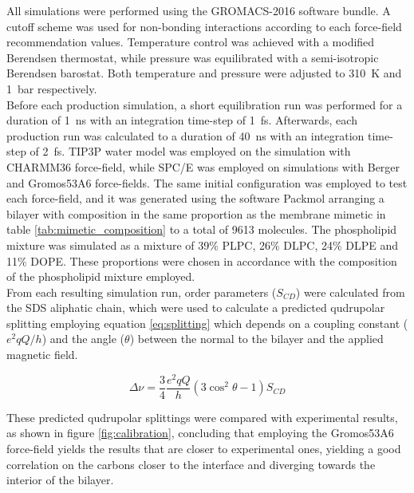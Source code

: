\documentclass[9pt]{article}
\begin{document}
All simulations were performed using the GROMACS-2016
software bundle. A cutoff scheme was used for non-bonding interactions according
to each force-field recommendation values. Temperature control was achieved with
a modified Berendsen thermostat, while pressure was
equilibrated with a semi-isotropic Berendsen barostat. Both temperature and
pressure were adjusted to \SI{310}{K} and \SI{1}{bar} respectively.\\
Before each production simulation, a short equilibration run was performed for a
duration of \SI{1}{ns} with an integration time-step of \SI{1}{fs}. Afterwards,
each production run was calculated to a duration of \SI{40}{ns} with an
integration time-step of \SI{2}{fs}. TIP3P water model was employed on the
simulation with CHARMM36 force-field, while SPC/E was employed on simulations
with Berger and Gromos53A6 force-fields. The same initial configuration was
employed to test each force-field, and it was generated using the software
Packmol arranging a bilayer with composition in the same
proportion as the membrane mimetic in table \ref{tab:mimetic_composition} to a
total of 9613 molecules. The phospholipid mixture was simulated as a mixture of
39\% PLPC, 26\% DLPC, 24\% DLPE and 11\% DOPE. These proportions were chosen in
accordance with the composition of the phospholipid mixture employed.\\

From each resulting simulation run, order parameters ($S_{CD}$) were calculated
from the SDS aliphatic chain, which were used to calculate a predicted qudrupolar
splitting employing equation \ref{eq:splitting} which depends on a coupling
constant ($e^2qQ/h$) and the angle ($\theta$) between the normal to the bilayer and the
applied magnetic field.

\begin{equation}
  \label{eq:splitting}
  \Delta\nu = \frac{3}{4} \frac{e^2qQ}{h}(3\cos^2\theta - 1) S_{CD}
\end{equation}

These predicted qudrupolar splittings were compared with experimental results,
as shown in figure \ref{fig:calibration}, concluding that employing the
Gromos53A6 force-field yields the results that are closer to experimental
ones, yielding a good correlation on the carbons closer to the interface and
diverging towards the interior of the bilayer.
\end{document}
